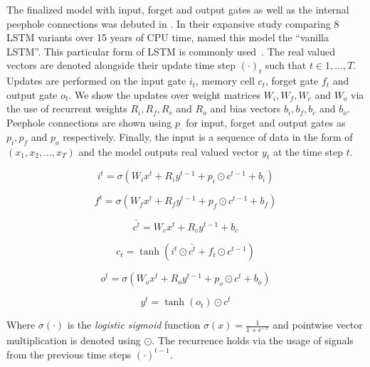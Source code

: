 
The finalized model with input, forget and output gates as well as the internal peephole connections was debuted in \textcite{graves_framewise_2005}.
In their expansive study comparing 8 LSTM variants over 15 years of CPU time, \textcite{greff_lstm_2017} named this model the \enquote{vanilla LSTM}.
This particular form of LSTM is commonly used~\cite{sutskever_sequence_2014}.
The real valued vectors are denoted alongside their update time step ${(\cdot)}_t$ such that $t \in {1, \dots, T}$.
Updates are performed on the input gate $i_t$, memory cell $c_t$, forget gate $f_t$ and output gate $o_t$.
We show the updates over weight matrices $W_i, W_f, W_c$ and $W_o$ via the use of recurrent weights $R_i, R_f, R_c$ and $R_o$ and bias vectors $b_i, b_f, b_c$ and $b_o$.
Peephole connections are shown using $p_{\cdot}$ for input, forget and output gates as $p_{i}, p_{f}$ and $p_{o}$ respectively.
Finally, the input is a sequence of data in the form of $(x_1, x_2, \dots, x_T)$ and the model outputs real valued vector $y_{t}$ at the time step $t$.

\begin{equation}
    i^{t} = \sigma\left(W_{i}x^{t} + R_{i}y^{t-1} + p_{i} \odot c^{t-1} + b_{i}\right)
\end{equation}

\begin{equation}
    f^{t} = \sigma\left(W_{f}x^{t} + R_{f}y^{t-1} + p_{f} \odot c^{t-1} + b_{f}\right)
\end{equation}

\begin{equation}
    \bar{c^{t}} = W_{c}x^{t} + R_{c}y^{t-1} + b_{c}
\end{equation}

\begin{equation}
    c_{t} = \tanh\left(i^{t} \odot \bar{c^{t}} + f_{t} \odot c^{t-1}\right)
\end{equation}

\begin{equation}
    o^{t} = \sigma\left(W_{o}x^{t} + R_{o}y^{t-1} + p_{o} \odot c^{t} + b_{o}\right)
\end{equation}

\begin{equation}
    y^{t} = \tanh(o_{t}) \odot c^{t}
\end{equation}

Where $\sigma(\cdot)$ is the \emph{logistic sigmoid} function $\sigma(x) = \frac{1}{1 + e^{-x}}$ and pointwise vector multiplication is denoted using $\odot$.
The recurrence holds via the usage of signals from the previous time steps $(\cdot)^{t-1}$.

